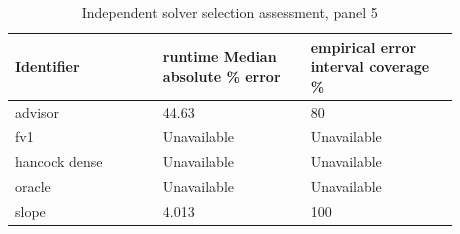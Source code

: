 \begin{longtable}{p{0.2933\linewidth}p{0.2933\linewidth}p{0.2933\linewidth}}
\caption{Independent solver selection assessment, panel 5}\\
\hline
Identifier & runtime Median absolute \% error & empirical error interval coverage \% \\
\hline\endhead
advisor & 44.63 & 80 \\
fv1 & Unavailable & Unavailable \\
hancock dense & Unavailable & Unavailable \\
oracle & Unavailable & Unavailable \\
slope & 4.013 & 100 \\
\end{longtable}
\endgroup
